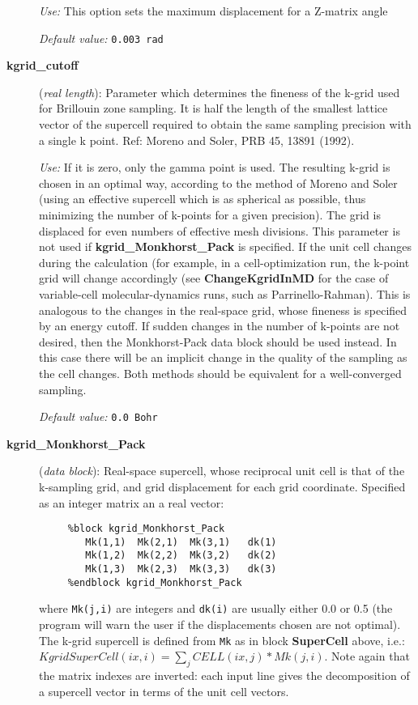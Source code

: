 \documentclass[11pt]{article}
\begin{document}
\begin{description}
{\it Use:} This option sets the maximum displacement for a Z-matrix angle

{\it Default value:} {\tt 0.003 rad }



\item[{\bf kgrid\_cutoff}] ({\it real length}): 
Parameter which determines
the fineness of the k-grid used for Brillouin zone sampling.
It is half the length of the smallest lattice vector of the supercell 
required to obtain the same sampling precision with a single k point.
Ref: Moreno and Soler, PRB 45, 13891 (1992).

{\it Use:} If it is zero, only the gamma point is used.  The resulting
k-grid is chosen in an optimal way, according to the method of Moreno
and Soler (using an effective supercell which is as spherical as
possible, thus minimizing the number of k-points for a given
precision). The grid is displaced for even numbers of effective mesh
divisions.  This parameter is not used if {\bf kgrid\_Monkhorst\_Pack}
is specified. If the unit cell changes during the calculation (for
example, in a cell-optimization run, the k-point
grid will change accordingly (see {\bf ChangeKgridInMD} for the case
of variable-cell molecular-dynamics runs, such as Parrinello-Rahman). 
This is analogous to the changes in the
real-space grid, whose fineness is specified by an energy cutoff. If
sudden changes in the number of k-points are not desired, then the
Monkhorst-Pack data block should be used instead. In this case there
will be an implicit change in the quality of the sampling as the cell
changes. Both methods should be equivalent for a well-converged
sampling.

{\it Default value:} {\tt 0.0 Bohr}
        

\item[{\bf kgrid\_Monkhorst\_Pack}] ({\it data block}): 
Real-space supercell, whose reciprocal unit cell is that of the
k-sampling grid, and grid displacement for each grid coordinate.
Specified as an integer matrix an a real vector:

\begin{verbatim}
     %block kgrid_Monkhorst_Pack
        Mk(1,1)  Mk(2,1)  Mk(3,1)   dk(1) 
        Mk(1,2)  Mk(2,2)  Mk(3,2)   dk(2) 
        Mk(1,3)  Mk(2,3)  Mk(3,3)   dk(3) 
     %endblock kgrid_Monkhorst_Pack 
\end{verbatim}

where {\tt Mk(j,i)} are integers and {\tt dk(i)} are usually
either 0.0 or 0.5 (the program will warn the user if the displacements
chosen are not optimal).
The k-grid supercell is defined from {\tt Mk}
as in block {\bf SuperCell} above, i.e.:
$KgridSuperCell(ix,i) = \sum_j CELL(ix,j)*Mk(j,i)$.
Note again that the matrix indexes are inverted: each input line 
gives the decomposition of a supercell vector in terms of the unit
cell vectors.



\end{description}
\end{document}
